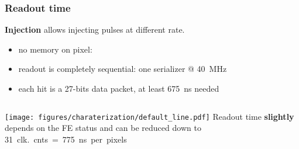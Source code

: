     \begin{frame}
        \frametitle{Readout time}
        \textbf{Injection} allows injecting pulses at different rate. 
        \begin{itemize}
            \item no memory on pixel: 
            \item readout is completely sequential: one serializer @ \SI{40}{MHz}
            \item each hit is a 27-bits data packet, at least \SI{675}{ns} needed
        \end{itemize}

        \medskip
        \begin{columns}
                \texttt{[image: figures/charaterization/default\_line.pdf]}
            Readout time \textbf{slightly} depends on the FE status and can be reduced down to \SI{31}{clk.}cnts = \SI{775}{ns} per pixels 

        \end{columns}            
    \end{frame}          
